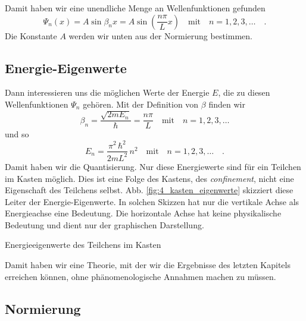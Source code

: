 Damit haben wir eine unendliche Menge an   Wellenfunktionen gefunden
\begin{equation}
    \Psi_n(x) = A \sin \beta_n x = A \sin \left(  \frac{n\pi}{L} x \right) \quad \text{mit} \quad n = 1, 2, 3, \dots \quad .
\end{equation}
Die Konstante $A$ werden wir unten aus der Normierung bestimmen.



\subsection{Energie-Eigenwerte}

Dann interessieren uns die möglichen Werte der Energie $E$, die zu diesen Wellenfunktionen $\Psi_n$ gehören. Mit der Definition von $\beta$ finden wir
\begin{equation}
    \beta_n = \frac{\sqrt{ 2 m E_n}}{\hbar} = \frac{n\pi}{L} \quad \text{mit} \quad n = 1, 2, 3, \dots
\end{equation}
und so 
\begin{equation}
    E_n = \frac{\pi^2 \, \hbar^2}{2 m L^2} \, n^2 \quad \text{mit} \quad n = 1, 2, 3, \dots \quad .
    \label{eq:4_En_kasten}
\end{equation}
Damit haben wir die Quantisierung. Nur diese Energiewerte sind für ein Teilchen im Kasten möglich. Dies ist eine Folge des Kastens, des \textit{confinement}, nicht eine Eigenschaft des Teilchens selbst.  Abb.  \ref{fig:4_kasten_eigenwerte} skizziert diese Leiter der Energie-Eigenwerte. In solchen Skizzen hat nur die vertikale Achse als Energieachse eine Bedeutung. Die horizontale Achse hat keine physikalische Bedeutung und dient nur der graphischen Darstellung.

\begin{marginfigure}
    \caption{Energieeigenwerte des Teilchens im Kasten}
    \label{fig:4_kasten_eigenwerte}
\end{marginfigure}

Damit haben wir eine Theorie, mit der wir die Ergebnisse des letzten Kapitels erreichen können, ohne phänomenologische Annahmen machen zu müssen.


\subsection{Normierung}

